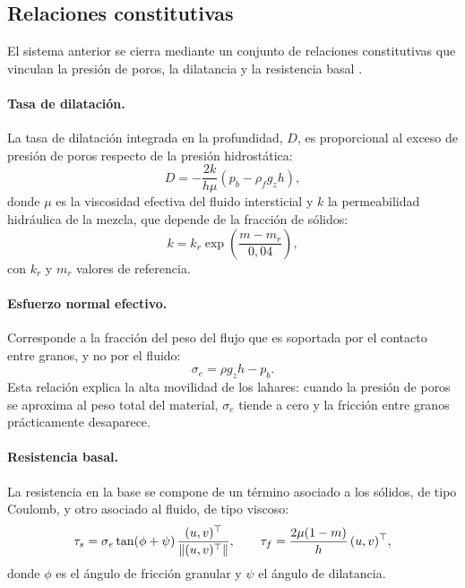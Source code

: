 \subsection{Relaciones constitutivas}
\label{subsec:constitutivas}

El sistema anterior se cierra mediante un conjunto de relaciones constitutivas que vinculan la presión de poros, la dilatancia y la resistencia basal \cite{iverson2014depth,george2025d}.

\paragraph{Tasa de dilatación.} La tasa de dilatación integrada en la profundidad, $D$, es proporcional al exceso de presión de poros respecto de la presión hidrostática:
\begin{equation}
    D = -\frac{2k}{h\mu}\left(p_b - \rho_f g_z h\right),
    \label{eq:dilatacion}
\end{equation}
donde $\mu$ es la viscosidad efectiva del fluido intersticial y $k$ la permeabilidad hidráulica de la mezcla, que depende de la fracción de sólidos:
\begin{equation}
    k = k_r \exp\!\left(\frac{m-m_r}{0{,}04}\right),
    \label{eq:permeabilidad}
\end{equation}
con $k_r$ y $m_r$ valores de referencia.

\paragraph{Esfuerzo normal efectivo.} Corresponde a la fracción del peso del flujo que es soportada por el contacto entre granos, y no por el fluido:
\begin{equation}
    \sigma_e = \rho g_z h - p_b.
    \label{eq:esfuerzo_efectivo}
\end{equation}
Esta relación explica la alta movilidad de los lahares: cuando la presión de poros se aproxima al peso total del material, $\sigma_e$ tiende a cero y la fricción entre granos prácticamente desaparece.

\paragraph{Resistencia basal.} La resistencia en la base se compone de un término asociado a los sólidos, de tipo Coulomb, y otro asociado al fluido, de tipo viscoso:
\begin{equation}
    \mathbf{\tau}_s = \sigma_e \tan(\phi+\psi)\,\frac{(u,v)^{\top}}{\left\lVert (u,v)^{\top}\right\rVert},
    \qquad
    \mathbf{\tau}_f = \frac{2\mu(1-m)}{h}\,(u,v)^{\top},
    \label{eq:resistencia_basal}
\end{equation}
donde $\phi$ es el ángulo de fricción granular y $\psi$ el ángulo de dilatancia.

